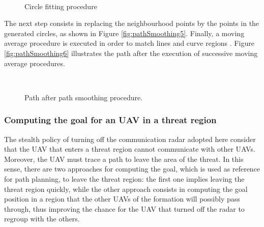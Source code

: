 \begin{figure}[h!]
      \centering            
        \\ \centering
      \caption{Circle fitting procedure}
\end{figure}

The next step consists in replacing the neighbourhood points by the points in the generated circles, as shown in Figure \ref{fig:pathSmoothing5}. Finally, a moving average procedure is executed in order to match lines and curve regions \cite{azami_2012}. Figure \ref{fig:pathSmoothing6} illustrates the path after the execution of successive moving average procedures.

\begin{figure}[h!]
      \centering            
        \\ \centering
      \caption{Path after path smoothing procedure.}
\end{figure}

\subsubsection{Computing the goal for an UAV in a threat region}

The stealth policy of turning off the communication radar adopted here consider that the UAV that enters a threat region cannot communicate with other UAVs. Moreover, the UAV must trace a path to leave the area of the threat. In this sense, there are two approaches for computing the goal, which is used as reference for path planning, to leave the threat region: the first one implies leaving the threat region quickly, while the other approach consists in computing the goal position in a region that the other UAVs of the formation will possibly pass through, thus improving the chance for the UAV that turned off the radar to regroup with the others.

